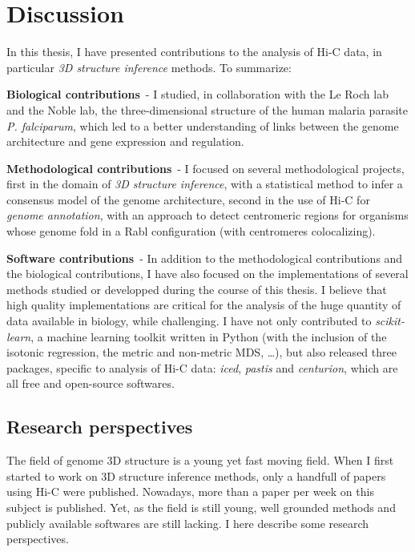 
\chapter{Discussion} %

In this thesis, I have presented contributions to the analysis of Hi-C data,
in particular \textit{3D structure inference} methods. To summarize:

\textbf{Biological contributions}\ - I studied, in collaboration with the Le Roch
lab and the Noble lab, the three-dimensional structure of the human malaria
parasite \textit{P. falciparum}, which led to a better understanding of links
between the genome architecture and gene expression and regulation.

\textbf{Methodological contributions}\ - I focused on several methodological
projects,
first in the domain of \textit{3D structure inference}, with a statistical
method to infer a consensus model of the genome architecture, second in the
use of Hi-C for \textit{genome annotation}, with an approach to detect
centromeric regions for organisms whose genome fold in a Rabl configuration
(with centromeres colocalizing).

\textbf{Software contributions}\ - In addition to the methodological
contributions and the biological contributions, I have also focused on the
implementations of several methods studied or developped during the course of
this thesis. I believe that high quality implementations are critical for the
analysis of the huge quantity of data available in biology, while challenging.
I have not only contributed to \textit{scikit-learn}, a machine learning
toolkit written in Python (with the inclusion of
the isotonic regression, the metric and non-metric MDS, \dots), but also
released three packages, specific to analysis of Hi-C data:
\textit{iced}, \textit{pastis} and
\textit{centurion}, which are all free and open-source softwares.

\section*{Research perspectives}

The field of genome 3D structure is a young yet fast moving field. When I
first started to work on 3D structure inference methods, only a handfull of
papers using Hi-C were published. Nowadays, more than a paper per week on
this subject is published. Yet, as the field is still young, well grounded
methods and publicly available softwares are still lacking. I here describe
some research perspectives.



